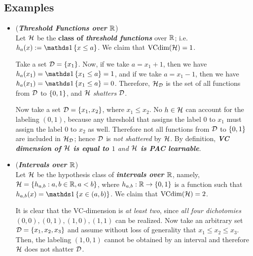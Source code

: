 \documentclass[11pt]{article}
\begin{document}
\subsection{Examples}
\begin{itemize}
\item \begin{example}(\textbf{\emph{Threshold Functions over ${\mathbb R}$}})\\
Let ${\mathcal H}$ be the \textbf{class of \emph{threshold functions}} over ${\mathbb R}$; i.e. $h_a(x) := \ind{x \le a}$.   We claim that \underline{$\text{VCdim}({\mathcal H}) = 1$}.

Take a set ${\mathcal D} = \left\{x_1\right\}$. Now, if we take $a = x_1 + 1$, then we have $h_a(x_1) = \ind{x_1 \le a} = 1$, and if we take $a = x_1 - 1$, then we have $h_a(x_1) =  \ind{x_1 \le a} = 0$. Therefore, ${\mathcal H}_{{\mathcal D}}$ is the set of all functions from ${\mathcal D}$ to $\left\{0,1\right\}$, and ${\mathcal H}$ \emph{shatters} ${\mathcal D}$. 

Now take a set ${\mathcal D} = \left\{x_1, x_2\right\}$, where $x_1 \le x_2$. No $h \in {\mathcal H}$ can account for the labeling $(0, 1)$, because any threshold that assigns the label $0$ to $x_1$ must assign the label $0$ to $x_2$ as well. Therefore not all functions from ${\mathcal D}$ to $\left\{0,1\right\}$ are included in ${\mathcal H}_{{\mathcal D}}$; hence ${\mathcal D}$ is \emph{not shattered} by ${\mathcal H}$. By definition, \emph{\textbf{VC dimension of ${\mathcal H}$ is equal to $1$} and \textbf{${\mathcal H}$ is PAC learnable}}.
\end{example}

\item \begin{example}(\textbf{\emph{Intervals over ${\mathbb R}$}})\\
Let ${\mathcal H}$ be the hypothesis class of \emph{\textbf{intervals over ${\mathbb R}$}}, namely, ${\mathcal H} = \left\{h_{a,b}: a,b \in {\mathbb R}, a < b\right\}$, where $h_{a,b} :
{\mathbb R} \to \left\{0,1\right\}$ is a function such that $h_{a,b}(x) = \ind{x \in (a,b)}$. We claim that \underline{$\text{VCdim}({\mathcal H}) = 2$}.

It is clear that the VC-dimension is \emph{at least two}, since \emph{all four dichotomies} $(0,0), (0, 1), (1, 0), (1, 1)$ can be realized. Now take
an arbitrary set ${\mathcal D} = \left\{x_1, x_2, x_3\right\}$ and assume without loss of generality that $x_1 \le x_2 \le x_3$. Then, the labeling $(1,0,1)$ cannot be obtained by an interval and therefore ${\mathcal H}$ does not shatter ${\mathcal D}$. 
\end{example}


\end{itemize}
\end{document}
